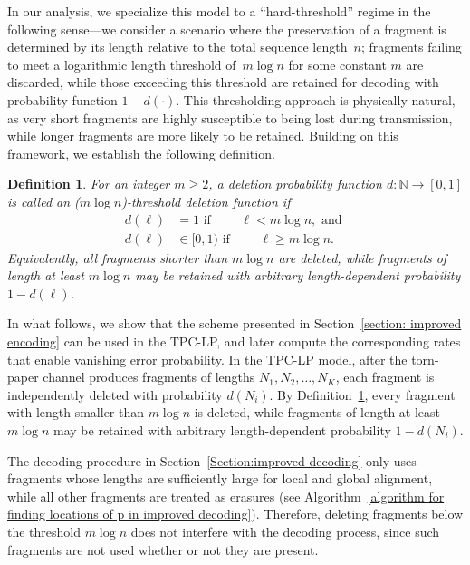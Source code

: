 \documentclass[journal,letterpaper,onecolumn,11pt]{IEEEtran}
\newtheorem{theorem}{Theorem}
\newtheorem{definition}{Definition}
\begin{document}
In our analysis, we specialize this model to a ``hard-threshold'' regime in the following sense---we consider a scenario where the preservation of a fragment is determined by its length relative to the total sequence length~$n$; fragments failing to meet a logarithmic length threshold of~$m\log n$ for some constant $m$ are discarded, while those exceeding this threshold are retained for decoding with probability function $1-d(\cdot)$. 
This thresholding approach is physically natural, as very short fragments are highly susceptible to being lost during transmission, while longer fragments are more likely to be retained.
Building on this framework, we establish the following definition.
\begin{definition}\label{definition:threshold deletion function}
 For an integer $m\ge 2$, a deletion probability function
$d:\mathbb{N}\to[0,1]$ is called an \emph{($m\log n$)-threshold deletion function} if
\begin{align*}
    d(\ell)&=1 \text{ if } \qquad \ell<m\log n, \text{ and }\\
    d(\ell)&\in[0,1) \text{ if } \qquad \ell\ge m\log n.
\end{align*}
Equivalently, all fragments shorter than $m\log n$ are deleted, while fragments
of length at least $m\log n$ may be retained with arbitrary length-dependent
probability $1-d(\ell)$.
\end{definition}
In what follows, we show that the scheme presented in Section~\ref{section: improved encoding} can be used in the TPC-LP, and later compute the corresponding rates that enable vanishing error probability.
In the TPC-LP model, after the torn-paper channel produces fragments of lengths
$N_1,N_2,\ldots,N_K$, each fragment is independently deleted with probability
$d(N_i)$.
By Definition~\ref{definition:threshold deletion function}, every fragment with
length smaller than $m\log n$ is deleted, while fragments of length at least $m\log n$ may be retained with arbitrary length-dependent probability $1-d(N_i)$.

The decoding procedure in Section~\ref{Section:improved decoding} only uses
fragments whose lengths are sufficiently large  for local and global alignment, while all other fragments are treated as erasures (see Algorithm~\ref{algorithm for finding locations of p in improved decoding}). 
Therefore, deleting fragments below the threshold $m\log n$ does not interfere with the decoding process, since such fragments are not used whether or not they are present.
\end{document}

